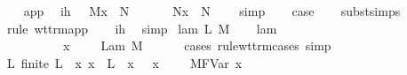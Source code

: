 \begin{isabellebody}
\ \ \isamarkupfalse%
\ app{\isacharparenleft}{}{\isacharcomma}{}{\isacharcomma}{}{\isacharparenright}\ \isamarkupfalse%
\ ih{\isacharcolon}\ {\isachardoublequoteopen}{\isasymGamma}\ {\isasymturnstile}\ M{\isacharprime}{\isacharbrackleft}x\ {\isacharcolon}{\isacharcolon}{\isacharequal}\ N{\isacharbrackright}\ {\isacharcolon}\ {\isasympi}\ {\isasymrightarrow}\ {\isasymsigma}{\isachardoublequoteclose}\ {\isachardoublequoteopen}{\isasymGamma}\ {\isasymturnstile}\ N{\isacharprime}{\isacharbrackleft}x\ {\isacharcolon}{\isacharcolon}{\isacharequal}\ N{\isacharbrackright}\ {\isacharcolon}\ {\isasympi}{\isachardoublequoteclose}\ \isamarkupfalse%
\ simp{\isacharplus}\isanewline
\ \ \isamarkupfalse%
\ {\isacharquery}case\isanewline
\ \ \isamarkupfalse%
\ subst{\isachardot}simps\isanewline
\ \ \isamarkupfalse%
\ {\isacharparenleft}rule\ wt{\isacharunderscore}trm{\isachardot}app{\isacharparenright}\isanewline
\ \ \isamarkupfalse%
\ ih\ \isamarkupfalse%
\ simp{\isacharplus}\isanewline
{}\isamarkupfalse%
\isanewline
{}\isamarkupfalse%
\ {\isacharparenleft}lam\ L\ M{\isacharparenright}\isanewline
\ \ \isamarkupfalse%
\ lam{\isacharparenleft}{}{\isacharparenright}\ \isamarkupfalse%
\ {\isasympi}\ {\isasymdelta}\ \ {}{\isacharcolon}\ {\isachardoublequoteopen}{\isasymsigma}\ {\isacharequal}\ {\isasympi}\ {\isasymrightarrow}\ {\isasymdelta}{\isachardoublequoteclose}\ {\isachardoublequoteopen}{\isacharparenleft}x{\isacharcomma}\ {\isasymtau}{\isacharparenright}\ {\isacharhash}\ {\isasymGamma}\ {\isasymturnstile}\ Lam\ M\ {\isacharcolon}\ {\isasympi}\ {\isasymrightarrow}\ {\isasymdelta}{\isachardoublequoteclose}\ \isamarkupfalse%
\ {\isacharparenleft}cases\ rule{\isacharcolon}wt{\isacharunderscore}trm{\isachardot}cases{\isacharcomma}\ simp{\isacharparenright}\isanewline
\ \ \isanewline
\ \ \isamarkupfalse%
\ {}{\isacharparenleft}{}{\isacharparenright}\ \isamarkupfalse%
\ {\isachardoublequoteopen}{\isasymexists}L{\isachardot}\ finite\ L\ {\isasymand}\ {\isacharparenleft}{\isasymforall}x{\isacharprime}{\isachardot}\ x{\isacharprime}\ {\isasymnotin}\ L\ {\isasymlongrightarrow}\ {\isacharparenleft}x{\isacharprime}{\isacharcomma}\ {\isasympi}{\isacharparenright}\ {\isacharhash}\ {\isacharparenleft}x{\isacharcomma}\ {\isasymtau}{\isacharparenright}\ {\isacharhash}\ {\isasymGamma}\ {\isasymturnstile}\ M{\isacharcircum}FVar\ x{\isacharprime}\ {\isacharcolon}\ {\isasymdelta}{\isacharparenright}{\isachardoublequoteclose}\isanewline

\end{isabellebody}

